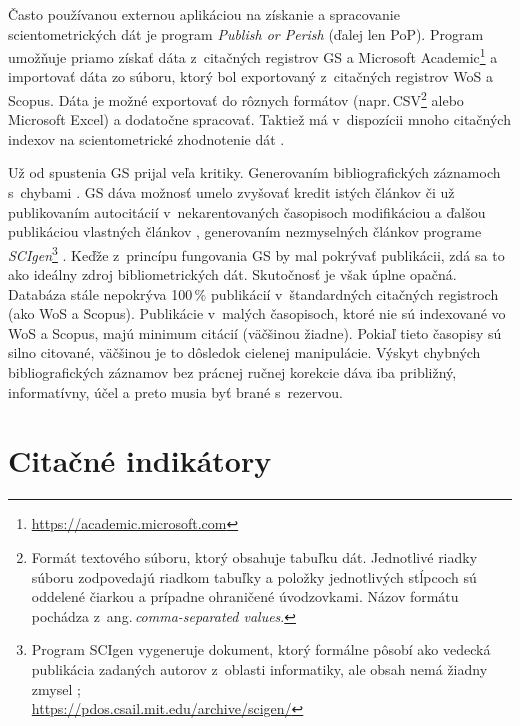 Často používanou externou aplikáciou na získanie a spracovanie scientometrických
dát je program \emph{Publish or Perish} (ďalej
len PoP).  Program umožňuje priamo získať dáta z~citačných registrov GS a
Microsoft Academic\footnote{\url{https://academic.microsoft.com}} a importovať
dáta zo súboru, ktorý bol exportovaný z~citačných registrov WoS a Scopus.  Dáta
je možné exportovať do rôznych formátov (napr.\,CSV\footnote{Formát textového
  súboru, ktorý obsahuje tabuľku dát.  Jednotlivé riadky súboru zodpovedajú
  riadkom tabuľky a položky jednotlivých stĺpcoch sú oddelené čiarkou a prípadne
  ohraničené úvodzovkami.  Názov formátu pochádza z~ang.\,\emph{comma-separated
    values}.} alebo Microsoft Excel) a dodatočne spracovať.  Taktiež má
v~dispozícii mnoho citačných indexov na scientometrické zhodnotenie dát
\citep{Harzing2011}.

Už od spustenia GS prijal veľa kritiky.  Generovaním bibliografických záznamoch
s~chybami \citep{Jacso2009,Jacso2010}.  GS dáva možnosť umelo zvyšovať kredit
istých článkov či už publikovaním autocitácií v~nekarentovaných časopisoch
modifikáciou a ďalšou publikáciou vlastných článkov \citep{Beel2010b},
generovaním nezmyselných článkov programe
\emph{SCIgen}\footnote{Program SCIgen vygeneruje dokument,
  ktorý formálne pôsobí ako vedecká publikácia zadaných autorov z~oblasti
  informatiky, ale obsah nemá žiadny zmysel
  \citep{Labbe2013};\\\url{https://pdos.csail.mit.edu/archive/scigen/}}
\citep{Beel2010a}.  Keďže z~princípu fungovania GS by mal pokrývať publikácii,
zdá sa to ako ideálny zdroj bibliometrických dát.  Skutočnosť je však úplne
opačná.  Databáza stále nepokrýva 100\,\% publikácií v~štandardných citačných
registroch (ako WoS a Scopus).  Publikácie v~malých časopisoch, ktoré nie sú
indexované vo WoS a Scopus, majú minimum citácií (väčšinou žiadne).  Pokiaľ
tieto časopisy sú silno citované, väčšinou je to dôsledok cielenej manipulácie.
Výskyt chybných bibliografických záznamov bez prácnej ručnej korekcie dáva iba
približný, informatívny, účel a preto musia byť brané s~rezervou.


\section{Citačné indikátory}
\label{sec:indicators}

